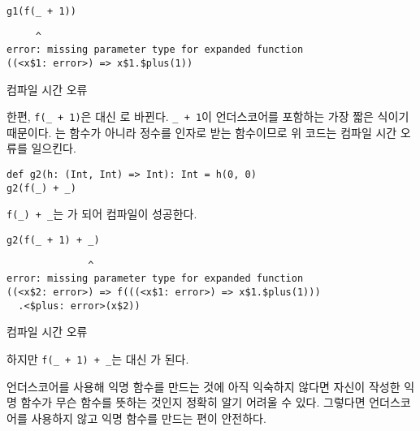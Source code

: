 \begin{verbatim}
g1(f(_ + 1))
\end{verbatim}
\vspace{-1em}
\begin{mdframed}[hidealllines=true,backgroundcolor=gray!10,innerleftmargin=3pt,innerrightmargin=3pt,leftmargin=-3pt,rightmargin=-3pt]
\begin{verbatim}
     ^
error: missing parameter type for expanded function
((<x$1: error>) => x$1.$plus(1))
\end{verbatim}
\vspace{-2em}
\begin{flushright}
\scriptsize\textsf{컴파일 시간 오류}
\end{flushright}
\end{mdframed}

한편, \verb!f(_ + 1)!은  대신 로 바뀐다.
\verb!_ + 1!이 언더스코어를 포함하는 가장 짧은 식이기 때문이다. 는
함수가 아니라 정수를 인자로 받는 함수이므로 위 코드는 컴파일 시간 오류를
일으킨다.

\begin{verbatim}
def g2(h: (Int, Int) => Int): Int = h(0, 0)
g2(f(_) + _)
\end{verbatim}

\verb!f(_) + _!는 가 되어 컴파일이 성공한다.

\begin{verbatim}
g2(f(_ + 1) + _)
\end{verbatim}
\vspace{-1em}
\begin{mdframed}[hidealllines=true,backgroundcolor=gray!10,innerleftmargin=3pt,innerrightmargin=3pt,leftmargin=-3pt,rightmargin=-3pt]
\begin{verbatim}
              ^
error: missing parameter type for expanded function
((<x$2: error>) => f(((<x$1: error>) => x$1.$plus(1)))
  .<$plus: error>(x$2))
\end{verbatim}
\vspace{-2em}
\begin{flushright}
\scriptsize\textsf{컴파일 시간 오류}
\end{flushright}
\end{mdframed}

하지만 \verb!f(_ + 1) + _!는  대신 가 된다.

언더스코어를 사용해 익명 함수를 만드는 것에 아직 익숙하지 않다면 자신이 작성한
익명 함수가 무슨 함수를 뜻하는 것인지 정확히 알기 어려울 수 있다. 그렇다면
언더스코어를 사용하지 않고 익명 함수를 만드는 편이 안전하다.

